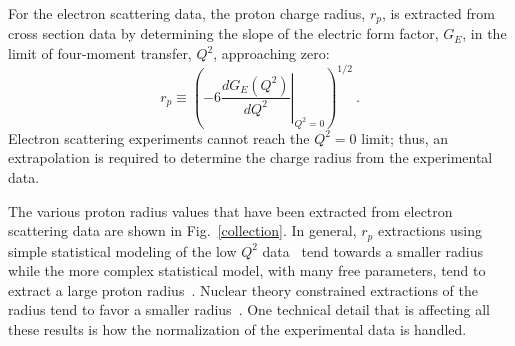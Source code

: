 \documentclass[10pt,superscriptaddress,aps,prc,twocolumn]{revtex4-1}
\begin{document}
For the electron scattering data, the proton charge radius, $r_p$, is extracted from
cross section data by determining the slope of the electric form factor, $G_E$, in the
limit of four-moment transfer, $Q^2$, approaching zero: 
\begin{equation}
\label{eq:radius}
  r_p \equiv %
    \left( -6  \left. \frac{dG_E(Q^2)}{dQ^2}
    \right|_{Q^{2}=0} \right)^{1/2} \>.
\end{equation}
Electron scattering experiments cannot reach the $Q^2 = 0$ limit; thus,
an extrapolation is required to determine the charge radius from the experimental data.

The various proton radius values that have been extracted from electron scattering data
are shown in Fig.~\ref{collection}.    
In general, $r_p$ extractions using simple statistical modeling of the 
low $Q^2$ data~\cite{Horbatsch:2015qda,Rosenfelder:1999cd,Griffioen:2015hta,Higinbotham:2015rja}
tend towards a smaller radius while the more complex statistical model, with many free 
parameters, tend to extract a large proton 
radius~\cite{Bernauer:2010wm,Bernauer:2013tpr,Lee:2015jqa,Graczyk:2014lba,Lorenz:2014vha}.
Nuclear theory constrained extractions of the radius tend to 
favor a smaller radius~\cite{Hohler:1976ax,Belushkin:2006qa,Horbatsch:2016ilr}.
One technical detail that is affecting all 
these results is how the normalization of the experimental data is handled.
\end{document}
